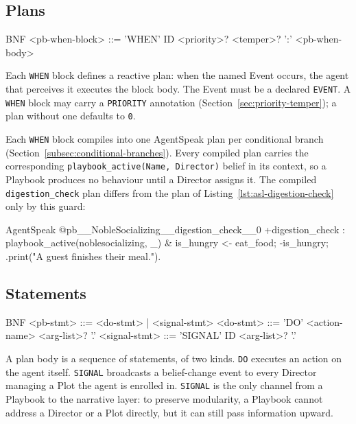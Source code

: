 \subsection{Plans}
\label{sec:plans}
 
\begin{codeblock}[]{BNF}
    <pb-when-block>  ::= 'WHEN' ID <priority>? <temper>? ':' <pb-when-body>
\end{codeblock}
 
Each \lstinline|WHEN| block defines a reactive plan: when the named Event occurs, the agent that perceives it executes the block body. The Event must be a declared \lstinline|EVENT|. A \lstinline|WHEN| block may carry a \lstinline|PRIORITY| annotation (Section~\ref{sec:priority-temper}); a plan without one defaults to \lstinline|0|.
 
Each \lstinline|WHEN| block compiles into one AgentSpeak plan per conditional branch (Section~\ref{subsec:conditional-branches}). Every compiled plan carries the corresponding \lstinline|playbook_active(Name, Director)| belief in its context, so a Playbook produces no behaviour until a Director assigns it. The compiled \lstinline|digestion_check| plan differs from the plan of Listing~\ref{lst:asl-digestion-check} only by this guard:
 
\begin{codeblock}[]{AgentSpeak}
@pb__NobleSocializing__digestion_check__0
+digestion_check : playbook_active(noblesocializing, _)
    & is_hungry <-
    eat_food;
    -is_hungry;
    .print("A guest finishes their meal.").
\end{codeblock}
 
\subsection{Statements}
\begin{codeblock}[]{BNF}
    <pb-stmt>        ::= <do-stmt> | <signal-stmt>
    <do-stmt>        ::= 'DO' <action-name> <arg-list>? '.'
    <signal-stmt>    ::= 'SIGNAL' ID <arg-list>? '.'
\end{codeblock}
 
A plan body is a sequence of statements, of two kinds. \lstinline|DO| executes an action on the agent itself. \lstinline|SIGNAL| broadcasts a belief-change event to every Director managing a Plot the agent is enrolled in. \lstinline|SIGNAL| is the only channel from a Playbook to the narrative layer: to preserve modularity, a Playbook cannot address a Director or a Plot directly, but it can still pass information upward.
 
